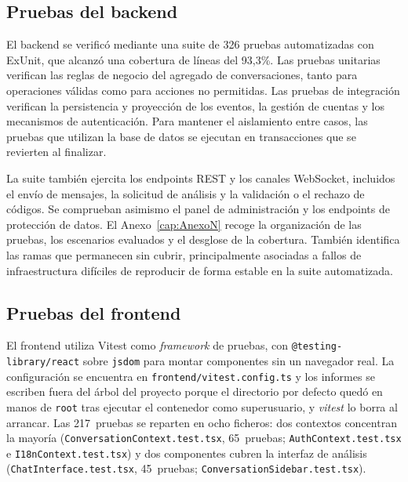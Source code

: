 \subsection{Pruebas del backend}
\label{sec:pruebas-backend}

El backend se verificó mediante una suite de 326 pruebas automatizadas con ExUnit, que alcanzó una cobertura de líneas del 93,3\%. Las pruebas unitarias verifican las reglas de negocio del agregado de conversaciones, tanto para operaciones válidas como para acciones no permitidas. Las pruebas de integración verifican la persistencia y proyección de los eventos, la gestión de cuentas y los mecanismos de autenticación. Para mantener el aislamiento entre casos, las pruebas que utilizan la base de datos se ejecutan en transacciones que se revierten al finalizar.

La suite también ejercita los endpoints REST y los canales WebSocket, incluidos el envío de mensajes, la solicitud de análisis y la validación o el rechazo de códigos. Se comprueban asimismo el panel de administración y los endpoints de protección de datos. El Anexo~\ref{cap:AnexoN} recoge la organización de las pruebas, los escenarios evaluados y el desglose de la cobertura. También identifica las ramas que permanecen sin cubrir, principalmente asociadas a fallos de infraestructura difíciles de reproducir de forma estable en la suite automatizada. 


\subsection{Pruebas del frontend}

El frontend utiliza Vitest como \emph{framework} de pruebas, con \texttt{@testing-library/react} sobre \texttt{jsdom} para montar componentes sin un navegador real. La configuración se encuentra en \texttt{frontend/\allowbreak vitest.config.ts} y los informes se escriben fuera del árbol del proyecto porque el directorio por defecto quedó en manos de \texttt{root} tras ejecutar el contenedor como superusuario, y \emph{vitest} lo borra al arrancar. Las 217~pruebas se reparten en ocho ficheros: dos contextos concentran la mayoría (\texttt{ConversationContext.test.tsx}, 65~pruebas; \texttt{AuthContext.test.tsx} e \texttt{I18nContext.test.tsx}) y dos componentes cubren la interfaz de análisis (\texttt{ChatInterface.test.tsx}, 45~pruebas; \texttt{ConversationSidebar.test.tsx}).

